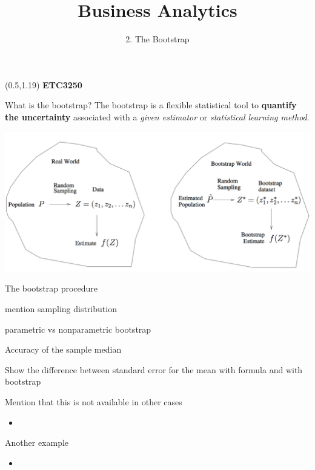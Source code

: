 \documentclass[14pt]{beamer}
\title[2. The Bootstrap]{Business Analytics}
\author{2. The Bootstrap}
\begin{document}
\begin{frame}[plain]{}
\maketitle
\begin{textblock}{11}(0.5,1.19){\color{white}\large
\textbf{ETC3250}}
\end{textblock}
\end{frame}

\begin{frame}[plain]{What is the bootstrap?}
%
The bootstrap is a flexible statistical tool to \textbf{quantify the uncertainty} associated with a \emph{given estimator} or \emph{statistical learning method}.
\begin{center}
\includegraphics[width=1\textwidth]{general-bootstrap}	
\end{center}
\end{frame}


\begin{frame}[plain]{The bootstrap procedure}


mention sampling distribution

parametric vs nonparametric bootstrap

\end{frame}

\begin{frame}[plain]{Accuracy of the sample median}

Show the difference between standard error for the mean with formula and with bootstrap

Mention that this is not available in other cases

\begin{itemize}
	\item 
\end{itemize}
\end{frame}

\begin{frame}[plain]{Another example}

\begin{itemize}
	\item
\end{itemize}
\end{frame}
\end{document}
